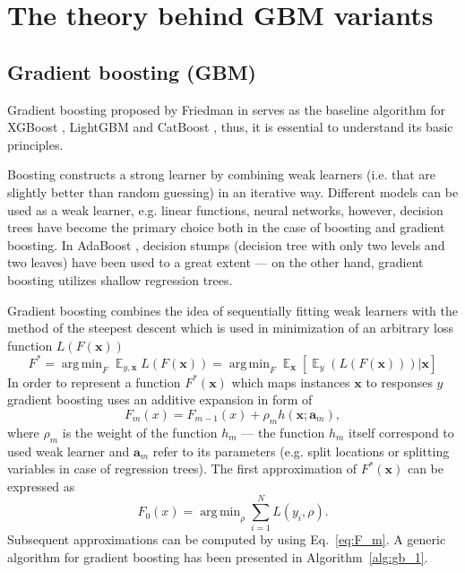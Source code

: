 \documentclass[magisterska, english]{pwr_wmat_praca_dyplomowa}
\theoremstyle{plain}
\numberwithin{theorem}{chapter}
\theoremstyle{definition}
\numberwithin{theorem}{chapter}
\DeclareMathOperator{\E}{\mathbb{E}}
\DeclareMathOperator*{\argmin}{arg\,min}
\begin{document}
\section{The theory behind GBM variants}
\subsection{Gradient boosting (GBM)}\label{section:gbm}
Gradient boosting proposed by Friedman in \cite{friedman_gbm} serves as the baseline algorithm for XGBoost \cite{xgboost}, LightGBM \cite{lightgbm} and CatBoost \cite{catboost}, thus, it is essential to understand its basic principles.  

Boosting constructs a strong learner by combining weak learners (i.e. that are slightly better than random guessing) in an iterative way. Different models can be used as a weak learner, e.g. linear functions, neural networks, however, decision trees have become the primary choice both in the case of boosting and gradient boosting. In AdaBoost \cite{adaboost}, decision stumps (decision tree with only two levels and two leaves) have been used to a great extent --- on the other hand, gradient boosting \cite{friedman_gbm} utilizes shallow regression trees. 

Gradient boosting combines the idea of sequentially fitting weak learners with the method of the steepest descent which is used in minimization of an arbitrary loss function $L\left(F(\mathbf{x})\right)$
\begin{equation}
    F^\ast = \argmin_F\E_{y,\mathbf{x}}L\left(F(\mathbf{x})\right) = \argmin_F\E_\mathbf{x}\left[\E_y\left(L\left(F(\mathbf{x})\right)\right)|\mathbf{x}\right]
\end{equation}
In order to represent a function $F^\ast(\mathbf{x})$ which maps instances $\mathbf{x}$ to responses $y$ gradient boosting uses an additive expansion in form of 
\begin{equation}\label{eq:F_m}
    F_m(x) = F_{m-1}(x) + \rho_mh(\mathbf{x};\mathbf{a}_m),
\end{equation}
where $\rho_m$ is the weight of the function $h_m$ --- the function $h_m$ itself correspond to used weak learner and $\mathbf{a}_m$ refer to its parameters (e.g. split locations or splitting variables in case of regression trees). The first approximation of $F^\ast(\mathbf{x})$ can be expressed as
\begin{equation}
    F_0(x) = \argmin_\rho \sum_{i=1}^N L(y_i,\rho).
\end{equation}
Subsequent approximations can be computed by using Eq.~\eqref{eq:F_m}.
A generic algorithm for gradient boosting has been presented in Algorithm~\ref{alg:gb_1}.
\end{document}
